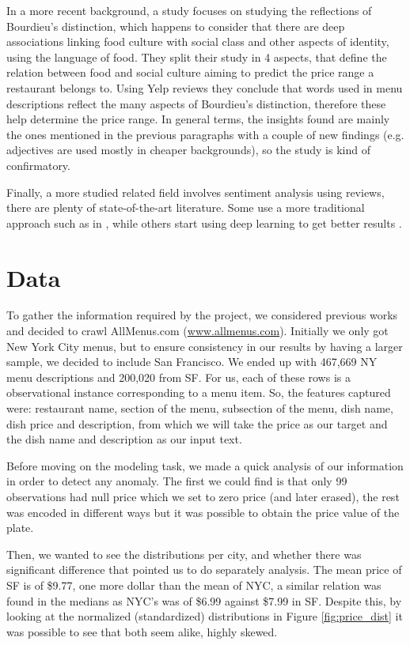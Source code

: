\documentclass[11pt,letterpaper]{article}
\begin{document}
In a more recent background, a study  \cite{jurafsky2016bordieu} focuses on studying the reflections of Bourdieu's distinction, which happens to consider that there are deep associations linking food culture with social class and other aspects of identity, using the language of food. They split their study in 4 aspects, that define the relation between food and social culture aiming to predict the price range a restaurant belongs to. Using Yelp reviews they conclude that words used in menu descriptions reflect the many aspects of Bourdieu's distinction, therefore these help determine the price range. In general terms, the insights found are mainly the ones mentioned in the previous paragraphs with a couple of new findings (e.g. adjectives are used mostly in cheaper backgrounds), so the study is kind of confirmatory.

Finally, a more studied related field involves sentiment analysis using reviews, there are plenty of state-of-the-art literature. Some use a more traditional approach such as in \cite{jurafsky2014narrative}, while others start using deep learning to get better results \cite{tang2015document}.

\section{Data}
To gather the information required by the project, we considered previous works and decided to crawl AllMenus.com (\url{www.allmenus.com}). Initially we only got New York City menus, but to ensure consistency in our results by having a larger sample, we decided to include San Francisco. We ended up with 467,669 NY menu descriptions and 200,020 from SF. For us, each of these rows is a observational instance corresponding to a menu item. So, the features captured were: restaurant name,  section of the menu, subsection of the menu, dish name, dish price and description, from which we will take the price as our target and the dish name and description as our input text.

Before moving on the modeling task, we made a quick analysis of our information in order to detect any anomaly.  The first we could find is that only 99 observations had null price which we set to zero price (and later erased), the rest was encoded in different ways but it was possible to obtain the price value of the plate. 

Then, we wanted to see the distributions per city, and whether there was significant difference that pointed us to do separately analysis. The mean price of SF is of \$9.77, one more dollar than the mean of NYC, a similar relation was found in the medians as NYC's was of \$6.99 against \$7.99 in SF. Despite this, by looking at the normalized (standardized) distributions in Figure \ref{fig:price_dist} it was possible to see that both seem alike, highly skewed. 
\end{document}
